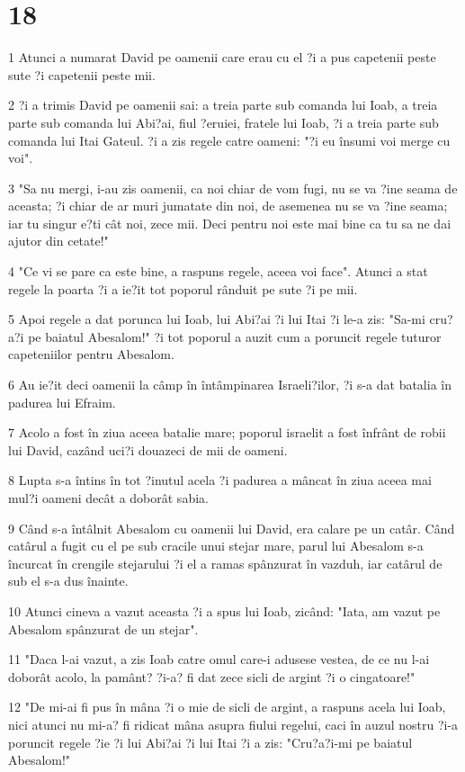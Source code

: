 \chapter{18}

\par 1 Atunci a numarat David pe oamenii care erau cu el ?i a pus capetenii peste sute ?i capetenii peste mii.
\par 2 ?i a trimis David pe oamenii sai: a treia parte sub comanda lui Ioab, a treia parte sub comanda lui Abi?ai, fiul ?eruiei, fratele lui Ioab, ?i a treia parte sub comanda lui Itai Gateul. ?i a zis regele catre oameni: "?i eu însumi voi merge cu voi".
\par 3 "Sa nu mergi, i-au zis oamenii, ca noi chiar de vom fugi, nu se va ?ine seama de aceasta; ?i chiar de ar muri jumatate din noi, de asemenea nu se va ?ine seama; iar tu singur e?ti cât noi, zece mii. Deci pentru noi este mai bine ca tu sa ne dai ajutor din cetate!"
\par 4 "Ce vi se pare ca este bine, a raspuns regele, aceea voi face". Atunci a stat regele la poarta ?i a ie?it tot poporul rânduit pe sute ?i pe mii.
\par 5 Apoi regele a dat porunca lui Ioab, lui Abi?ai ?i lui Itai ?i le-a zis: "Sa-mi cru?a?i pe baiatul Abesalom!" ?i tot poporul a auzit cum a poruncit regele tuturor capeteniilor pentru Abesalom.
\par 6 Au ie?it deci oamenii la câmp în întâmpinarea Israeli?ilor, ?i s-a dat batalia în padurea lui Efraim.
\par 7 Acolo a fost în ziua aceea batalie mare; poporul israelit a fost înfrânt de robii lui David, cazând uci?i douazeci de mii de oameni.
\par 8 Lupta s-a întins în tot ?inutul acela ?i padurea a mâncat în ziua aceea mai mul?i oameni decât a doborât sabia.
\par 9 Când s-a întâlnit Abesalom cu oamenii lui David, era calare pe un catâr. Când catârul a fugit cu el pe sub cracile unui stejar mare, parul lui Abesalom s-a încurcat în crengile stejarului ?i el a ramas spânzurat în vazduh, iar catârul de sub el s-a dus înainte.
\par 10 Atunci cineva a vazut aceasta ?i a spus lui Ioab, zicând: "Iata, am vazut pe Abesalom spânzurat de un stejar".
\par 11 "Daca l-ai vazut, a zis Ioab catre omul care-i adusese vestea, de ce nu l-ai doborât acolo, la pamânt? ?i-a? fi dat zece sicli de argint ?i o cingatoare!"
\par 12 "De mi-ai fi pus în mâna ?i o mie de sicli de argint, a raspuns acela lui Ioab, nici atunci nu mi-a? fi ridicat mâna asupra fiului regelui, caci în auzul nostru ?i-a poruncit regele ?ie ?i lui Abi?ai ?i lui Itai ?i a zis: "Cru?a?i-mi pe baiatul Abesalom!"
